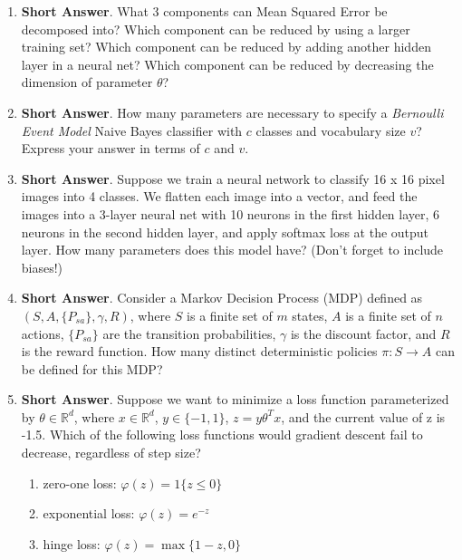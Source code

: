 \documentclass{article}
\newif\ifsolutions
\newenvironment{labelledanswer}{{\bf Answer:} \sf }{}%
\newcommand{\answer}[2]
{{
\ifsolutions
\begin{labelledanswer}
\color{red} 
#2
\end{labelledanswer}
\else
#1
\fi
}}
\begin{document}
\begin{enumerate}

\item \textbf{Short Answer}. 
What 3 components can Mean Squared Error be decomposed into? Which component can be reduced by using a larger training set? Which component can be reduced by adding another hidden layer in a neural net? Which component can be reduced by decreasing the dimension of parameter $\theta$?

\answer{}{}

\item \textbf{Short Answer}. 
How many parameters are necessary to specify a \emph{Bernoulli Event Model} Naive Bayes classifier with $c$ classes and vocabulary size $v$? Express your answer in terms of $c$ and $v$.

\answer{}{We would need $v\times c$ parameters in total.}

\item \textbf{Short Answer}.
Suppose we train a neural network to classify 16 x 16 pixel images into 4 classes. We flatten each image into a vector, and feed the images into a 3-layer neural net with 10 neurons in the first hidden layer, 6 neurons in the second hidden layer, and apply softmax loss at the output layer. How many parameters does this model have? (Don't forget to include biases!)

\answer{}{}

\item \textbf{Short Answer}.
Consider a Markov Decision Process (MDP) defined as $(S, A, \{P_{sa}\}, \gamma, R)$, where $S$ is a finite set of $m$ states, $A$ is a finite set of $n$ actions, $\{P_{sa}\}$ are the transition probabilities, $\gamma$ is the discount factor, and $R$ is the reward function.
How many distinct deterministic policies $\pi:S\to A$ can be defined for this MDP?

\answer{}{}

\item \textbf{Short Answer}. Suppose we want to minimize a loss function parameterized by $\theta \in \mathbb{R}^d$, where $x \in \mathbb{R}^d$, $y \in \{-1, 1\}$, $z = y \theta^T x$, and the current value of z is -1.5. Which of the following loss functions would gradient descent fail to decrease, regardless of step size?
    \begin{enumerate}
        \item zero-one loss: $\varphi(z) = 1\{z \le 0\}$
        \item exponential loss: $\varphi(z) = e^{-z}$
        \item hinge loss: $\varphi(z) = \max\{1-z, 0\}$
    \end{enumerate}
\answer{}{
(a) would not work here as the loss function is a straight line and does not have anything for gradient descent to work with. I found a good graphical plot for all these loss functions:

}
\end{enumerate}
\end{document}
